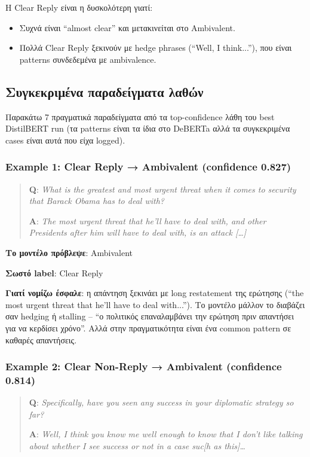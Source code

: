\documentclass[12pt]{fphw}
\begin{document}
Η Clear Reply είναι η δυσκολότερη γιατί:
\begin{itemize}
    \item Συχνά είναι ``almost clear'' και μετακινείται στο Ambivalent.
    \item Πολλά Clear Reply ξεκινούν με hedge phrases (``Well, I think...''), που είναι patterns συνδεδεμένα με ambivalence.
\end{itemize}

\subsection{Συγκεκριμένα παραδείγματα λαθών}

Παρακάτω 7 πραγματικά παραδείγματα από τα top-confidence λάθη του best DistilBERT run (τα patterns είναι τα ίδια στο DeBERTa αλλά τα συγκεκριμένα cases είναι αυτά που είχα logged).

\subsubsection{Example 1: Clear Reply → Ambivalent (confidence 0.827)}

\begin{quote}
\textbf{Q}: \emph{What is the greatest and most urgent threat when it comes to security that Barack Obama has to deal with?}

\textbf{A}: \emph{The most urgent threat that he'll have to deal with, and other Presidents after him will have to deal with, is an attack [\dots]}
\end{quote}

\textbf{Το μοντέλο πρόβλεψε}: Ambivalent

\textbf{Σωστό label}: Clear Reply

\textbf{Γιατί νομίζω έσφαλε}: η απάντηση ξεκινάει με long restatement της ερώτησης (``the most urgent threat that he'll have to deal with...''). Το μοντέλο μάλλον το διαβάζει σαν hedging ή stalling -- ``ο πολιτικός επαναλαμβάνει την ερώτηση πριν απαντήσει για να κερδίσει χρόνο''. Αλλά στην πραγματικότητα είναι ένα common pattern σε καθαρές απαντήσεις.

\subsubsection{Example 2: Clear Non-Reply → Ambivalent (confidence 0.814)}

\begin{quote}
\textbf{Q}: \emph{Specifically, have you seen any success in your diplomatic strategy so far?}

\textbf{A}: \emph{Well, I think you know me well enough to know that I don't like talking about whether I see success or not in a case suc[h as this]\dots}
\end{quote}
\end{document}
